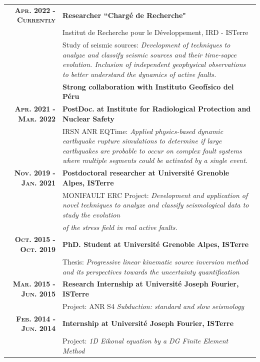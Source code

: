 \documentclass[a4paper]{article} %
\begin{document}
\begin{tabular}{rp{12cm}}

{\bf \textsc{Apr. 2022 - Currently}} & {\bf Researcher ``Charg\'e de Recherche"} \\
& Institut de Recherche pour le D\'eveloppement, IRD - ISTerre \\
& Study of seismic sources: \emph{Development of techniques to analyze and classify seismic sources and their time-sapce evolution. Inclusion of independent geophysical observations to better understand the dynamics of active faults.} \\
& \textbf{Strong collaboration with Instituto Geof\'isico del P\'eru}  \\[0.6em] 

{\bf \textsc{Apr. 2021 - Mar. 2022}} & {\bf PostDoc. at Institute for Radiological Protection and Nuclear Safety} \\
& IRSN ANR EQTime: \emph{Applied physics-based dynamic earthquake rupture simulations to determine if large earthquakes are probable to occur on complex fault systems where multiple segments could be activated by a single event.} \\[0.6em] 

{\bf \textsc{Nov. 2019 - Jan. 2021}} & {\bf Postdoctoral researcher at Universit\'e Grenoble Alpes, ISTerre} \\
& MONIFAULT ERC Project: \emph{Development and application of novel techniques to analyze and classify seismological data to study the evolution} \\
& \emph{of the stress field in real active faults.}  \\[0.6em] 

{\bf \textsc{Oct. 2015 - Oct. 2019}} & {\bf PhD. Student at Universit\'e Grenoble Alpes, ISTerre} \\
& Thesis: \emph{Progressive linear kinematic source inversion
method and its perspectives towards the
uncertainty quantification} \\[0.6em] 

{\bf \textsc{Mar. 2015 - Jun. 2015}} & {\bf Research Internship at Universit\'e Joseph Fourier, ISTerre} \\
& Project:  ANR S4 \emph{Subduction: standard and slow seismology}\\[0.6em]

{\bf \textsc{Feb. 2014 - Jun. 2014}} & {\bf Internship at Universit\'e Joseph Fourier, ISTerre} \\
& Project: \emph{1D Eikonal equation by a DG Finite Element Method}\\[0.6em]


\end{tabular}
\end{document}
